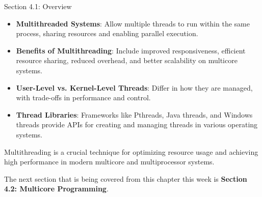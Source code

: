 \begin{notes}{Section 4.1: Overview}
\begin{highlight}
        \begin{itemize}
            \item \textbf{Multithreaded Systems}: Allow multiple threads to run within the same process, sharing resources and enabling parallel execution.
            \item \textbf{Benefits of Multithreading}: Include improved responsiveness, efficient resource sharing, reduced overhead, and better scalability on multicore systems.
            \item \textbf{User-Level vs. Kernel-Level Threads}: Differ in how they are managed, with trade-offs in performance and control.
            \item \textbf{Thread Libraries}: Frameworks like Pthreads, Java threads, and Windows threads provide APIs for creating and managing threads in various operating systems.
        \end{itemize}
    
    Multithreading is a crucial technique for optimizing resource usage and achieving high performance in modern multicore and multiprocessor systems.
    
    \end{highlight}
\end{notes}

The next section that is being covered from this chapter this week is \textbf{Section 4.2: Multicore Programming}.

